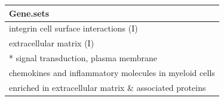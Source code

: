 \begin{tabular}{l}
  \hline
Gene.sets \\ 
  \hline
integrin cell surface interactions (I) \\ 
  extracellular matrix (I) \\ 
  * signal transduction, plasma membrane \\ 
  chemokines and inflammatory molecules in myeloid cells \\ 
  enriched in extracellular matrix \& associated proteins \\ 
   \hline
\end{tabular}
